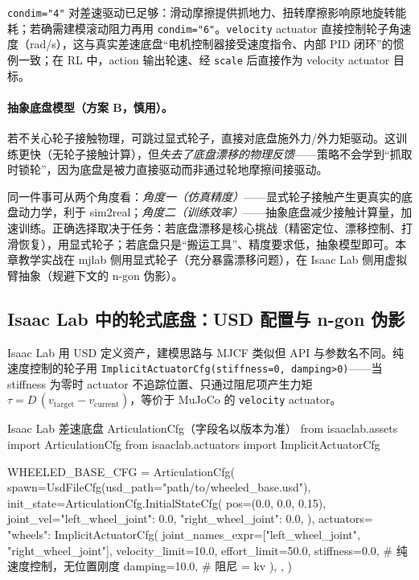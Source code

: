 \verb|condim="4"| 对差速驱动已足够：滑动摩擦提供抓地力、扭转摩擦影响原地旋转能耗；若确需建模滚动阻力再用 \verb|condim="6"|。\verb|velocity| actuator 直接控制轮子角速度（rad/s），这与真实差速底盘“电机控制器接受速度指令、内部 PID 闭环”的惯例一致；在 RL 中，action 输出轮速、经 \verb|scale| 后直接作为 velocity actuator 目标。

\paragraph{抽象底盘模型（方案 B，慎用）。}若不关心轮子接触物理，可跳过显式轮子，直接对底盘施外力/外力矩驱动。这训练更快（无轮子接触计算），但\emph{失去了底盘漂移的物理反馈}——策略不会学到“抓取时锁轮”，因为底盘是被力直接驱动而非通过轮地摩擦间接驱动。

\begin{insight}\label{ins:rlmc-wh-fidelity}
同一件事可从两个角度看：\emph{角度一（仿真精度）}——显式轮子接触产生更真实的底盘动力学，利于 sim2real；\emph{角度二（训练效率）}——抽象底盘减少接触计算量，加速训练。正确选择取决于任务：若底盘漂移是核心挑战（精密定位、漂移控制、打滑恢复），用显式轮子；若底盘只是“搬运工具”、精度要求低，抽象模型即可。本章教学实战在 mjlab 侧用显式轮子（充分暴露漂移问题），在 Isaac Lab 侧用虚拟臂抽象（规避下文的 n-gon 伪影）。
\end{insight}

\subsection{Isaac Lab 中的轮式底盘：USD 配置与 n-gon 伪影}
\label{sec:rlmc-wh-isaac-base}

Isaac Lab 用 USD 定义资产，建模思路与 MJCF 类似但 API 与参数名不同。纯速度控制的轮子用 \verb|ImplicitActuatorCfg(stiffness=0, damping>0)|——当 stiffness 为零时 actuator 不追踪位置、只通过阻尼项产生力矩 $\tau=D\,(v_{\text{target}}-v_{\text{current}})$，等价于 MuJoCo 的 \verb|velocity| actuator。

\begin{codebox}[Python]{Isaac Lab 差速底盘 ArticulationCfg（字段名以版本为准）}
from isaaclab.assets import ArticulationCfg
from isaaclab.actuators import ImplicitActuatorCfg

WHEELED_BASE_CFG = ArticulationCfg(
    spawn=UsdFileCfg(usd_path="path/to/wheeled_base.usd"),
    init_state=ArticulationCfg.InitialStateCfg(
        pos=(0.0, 0.0, 0.15),
        joint_vel={"left_wheel_joint": 0.0, "right_wheel_joint": 0.0},
    ),
    actuators={
        "wheels": ImplicitActuatorCfg(
            joint_names_expr=["left_wheel_joint", "right_wheel_joint"],
            velocity_limit=10.0,
            effort_limit=50.0,
            stiffness=0.0,   # 纯速度控制，无位置刚度
            damping=10.0,    # 阻尼 = kv
        ),
    },
)
\end{codebox}

